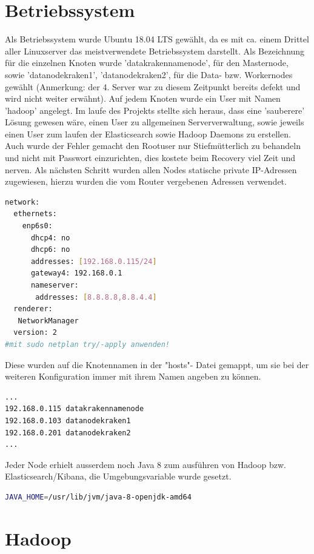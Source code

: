 \documentclass[12pt,oneside,a4paper,parskip]{scrbook}
\begin{document}
\section{Betriebssystem} Als Betriebssystem wurde Ubuntu 18.04 LTS gewählt, da es mit ca. einem Drittel aller Linuxserver das meistverwendete Betriebssystem darstellt. Als Bezeichnung für die einzelnen Knoten wurde 'datakrakennamenode', für den Masternode, sowie 'datanodekraken1', 'datanodekraken2', für die Data- bzw. Workernodes gewählt (Anmerkung: der 4. Server war zu diesem Zeitpunkt bereits defekt und wird nicht weiter erwähnt). Auf jedem Knoten wurde ein User mit Namen 'hadoop' angelegt. Im laufe des Projekts stellte sich heraus, dass eine 'sauberere' Lösung gewesen wäre, einen User zu allgemeinen Serververwaltung, sowie jeweils einen User zum laufen der Elasticsearch sowie Hadoop Daemons zu erstellen. Auch wurde der Fehler gemacht den Rootuser nur Stiefmütterlich zu behandeln und nicht mit Passwort einzurichten, dies kostete beim Recovery viel Zeit und nerven.\newline
Als nächsten Schritt wurden allen Nodes statische private IP-Adressen zugewiesen, hierzu wurden die vom Router vergebenen Adressen verwendet. \pagebreak
\begin{lstlisting}[caption=datakrakennamenode: /etc/netplan/00-installer-config.yaml,label=hosts,language=bash]
network:
  ethernets:
    enp6s0:
      dhcp4: no
      dhcp6: no
      addresses: [192.168.0.115/24]
      gateway4: 192.168.0.1
      nameserver:
       addresses: [8.8.8.8,8.8.4.4]
  renderer:
   NetworkManager
  version: 2
#mit sudo netplan try/-apply anwenden!
\end{lstlisting}
Diese wurden auf die Knotennamen in der "hosts"- Datei gemappt, um sie bei der weiteren Konfiguration immer mit ihrem Namen angeben zu können.
\begin{lstlisting}[caption=etc/hosts,label=hosts,language=bash]
...
192.168.0.115 datakrakennamenode
192.168.0.103 datanodekraken1
192.168.0.201 datanodekraken2
...
\end{lstlisting}
Jeder Node erhielt ausserdem noch Java 8 zum ausführen von Hadoop bzw. Elasticsearch/Kibana, die Umgebungsvariable wurde gesetzt.
\begin{lstlisting}[caption=etc/environment,label=javaenv,language=bash]
JAVA_HOME=/usr/lib/jvm/java-8-openjdk-amd64
\end{lstlisting}

\pagebreak

\section{Hadoop}
\end{document}
